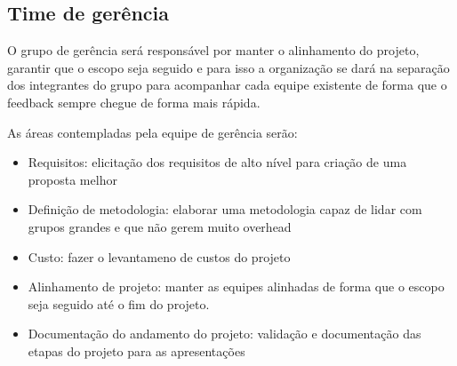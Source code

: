 \subsection{Time de gerência}

O grupo de gerência será responsável por manter o alinhamento do projeto, garantir que o escopo seja seguido e para isso a organização se dará na separação dos integrantes do grupo para acompanhar cada equipe existente de forma que o feedback sempre chegue de forma mais rápida.

As áreas contempladas pela equipe de gerência serão:

\begin{itemize}
\item Requisitos: elicitação dos requisitos de alto nível para criação de uma proposta melhor
\item Definição de metodologia: elaborar uma metodologia capaz de lidar com grupos grandes e que não gerem muito overhead
\item Custo: fazer o levantameno de custos do projeto
\item Alinhamento de projeto: manter as equipes alinhadas de forma que o escopo seja seguido até o fim do projeto.
\item Documentação do andamento do projeto: validação e documentação das etapas do projeto para as apresentações
\end{itemize}